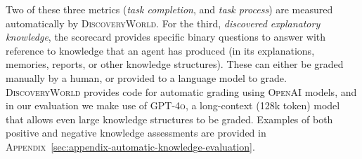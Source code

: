 \documentclass{article}
\newcommand{\env}{\textsc{DiscoveryWorld}\xspace}
\begin{document}
Two of these three metrics (\textit{task completion}, and \textit{task process}) are measured automatically by \env.  For the third, \textit{discovered explanatory knowledge}, the scorecard provides specific binary questions to answer with reference to knowledge that an agent has produced (in its explanations, memories, reports, or other knowledge structures).  These can either be graded manually by a human, or provided to a language model to grade.  \env provides code for automatic grading using \textsc{OpenAI} models, and in our evaluation we make use of \textsc{GPT-4o}, a long-context (128k token) model that allows even large knowledge structures to be graded.  Examples of both positive and negative knowledge assessments are provided in \textsc{Appendix}~\ref{sec:appendix-automatic-knowledge-evaluation}.
\end{document}
